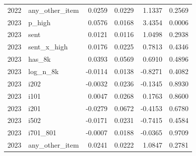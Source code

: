 \begin{tabular}{rlrrrr}
2022 & any\_other\_item & 0.0259 & 0.0229 & 1.1337 & 0.2569 \\
2023 & p\_high & 0.0576 & 0.0168 & 3.4354 & 0.0006 \\
2023 & sent & 0.0121 & 0.0116 & 1.0498 & 0.2938 \\
2023 & sent\_x\_high & 0.0176 & 0.0225 & 0.7813 & 0.4346 \\
2023 & has\_8k & 0.0393 & 0.0569 & 0.6910 & 0.4896 \\
2023 & log\_n\_8k & -0.0114 & 0.0138 & -0.8271 & 0.4082 \\
2023 & i202 & -0.0032 & 0.0236 & -0.1345 & 0.8930 \\
2023 & i101 & 0.0047 & 0.0268 & 0.1763 & 0.8600 \\
2023 & i201 & -0.0279 & 0.0672 & -0.4153 & 0.6780 \\
2023 & i502 & -0.0171 & 0.0231 & -0.7415 & 0.4584 \\
2023 & i701\_801 & -0.0007 & 0.0188 & -0.0365 & 0.9709 \\
2023 & any\_other\_item & 0.0241 & 0.0222 & 1.0847 & 0.2781 \\
\bottomrule
\end{tabular}
